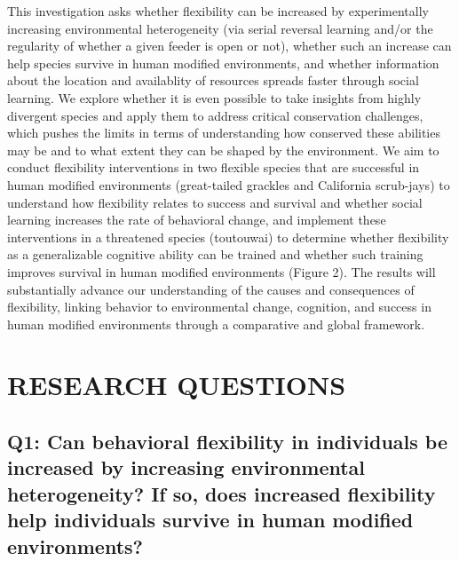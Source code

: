 \documentclass[
]{article}
\begin{document}
This investigation asks whether flexibility can be increased by
experimentally increasing environmental heterogeneity (via serial
reversal learning and/or the regularity of whether a given feeder is
open or not), whether such an increase can help species survive in human
modified environments, and whether information about the location and
availablity of resources spreads faster through social learning. We
explore whether it is even possible to take insights from highly
divergent species and apply them to address critical conservation
challenges, which pushes the limits in terms of understanding how
conserved these abilities may be and to what extent they can be shaped
by the environment. We aim to conduct flexibility interventions in two
flexible species that are successful in human modified environments
(great-tailed grackles and California scrub-jays) to understand how
flexibility relates to success and survival and whether social learning
increases the rate of behavioral change, and implement these
interventions in a threatened species (toutouwai) to determine whether
flexibility as a generalizable cognitive ability can be trained and
whether such training improves survival in human modified environments
(Figure 2). The results will substantially advance our understanding of
the causes and consequences of flexibility, linking behavior to
environmental change, cognition, and success in human modified
environments through a comparative and global framework.

\hypertarget{research-questions}{%
\section{RESEARCH QUESTIONS}\label{research-questions}}

\hypertarget{q1-can-behavioral-flexibility-in-individuals-be-increased-by-increasing-environmental-heterogeneity-if-so-does-increased-flexibility-help-individuals-survive-in-human-modified-environments}{%
\subsection{Q1: Can behavioral flexibility in individuals be increased
by increasing environmental heterogeneity? If so, does increased
flexibility help individuals survive in human modified
environments?}\label{q1-can-behavioral-flexibility-in-individuals-be-increased-by-increasing-environmental-heterogeneity-if-so-does-increased-flexibility-help-individuals-survive-in-human-modified-environments}}
\end{document}
